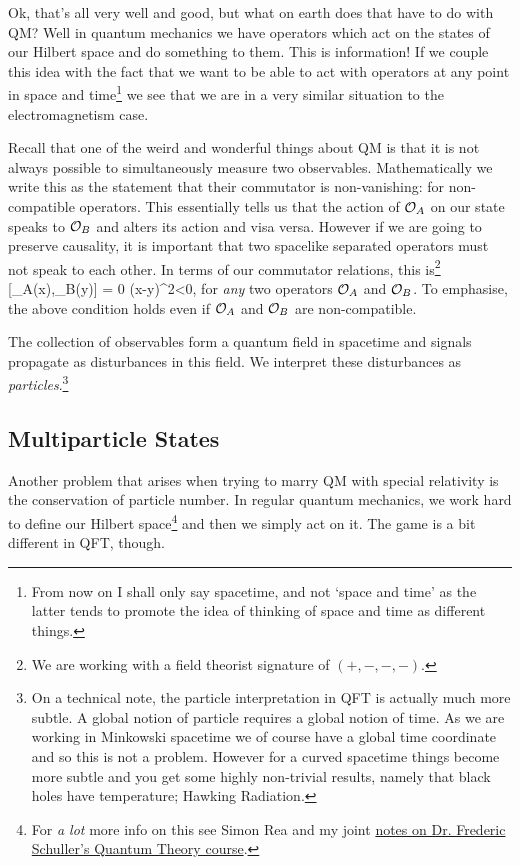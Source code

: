 Ok, that's all very well and good, but what on earth does that have to do with QM? Well in quantum mechanics we have operators which act on the states of our Hilbert space and do something to them. This is information! If we couple this idea with the fact that we want to be able to act with operators at any point in space and time\footnote{From now on I shall only say spacetime, and not `space and time' as the latter tends to promote the idea of thinking of space and time as different things.} we see that we are in a very similar situation to the electromagnetism case. 

Recall that one of the weird and wonderful things about QM is that it is not always possible to simultaneously measure two observables. Mathematically we write this as the statement that their commutator is non-vanishing:
 
\ese 
for non-compatible operators. This essentially tells us that the action of $\mathcal{O}_A$ on our state speaks to $\mathcal{O}_B$ and alters its action and visa versa. However if we are going to preserve causality, it is important that two spacelike separated operators must not speak to each other. In terms of our commutator relations, this is\footnote{We are working with a field theorist signature of $(+,-,-,-)$.}
\be
\label{eqn:CausualOperators}
    [\hat{\cO}_A(x),\hat{\cO}_B(y)] = 0  \qquad {} (x-y)^2<0,
\ee 
for \textit{any} two operators $\mathcal{O}_A$ and $\mathcal{O}_B$. To emphasise, the above condition holds even if $\mathcal{O}_A$ and $\mathcal{O}_B$ are non-compatible. 

The collection of observables form a quantum field in spacetime and signals propagate as disturbances in this field. We interpret these disturbances as \textit{particles}.\footnote{On a technical note, the particle interpretation in QFT is actually much more subtle. A global notion of particle requires a global notion of time. As we are working in Minkowski spacetime we of course have a global time coordinate and so this is not a problem. However for a curved spacetime things become more subtle and you get some highly non-trivial results, namely that black holes have temperature; Hawking Radiation.}

\subsection{Multiparticle States}

Another problem that arises when trying to marry QM with special relativity is the conservation of particle number. In regular quantum mechanics, we work hard to define our Hilbert space\footnote{For \textit{a lot} more info on this see Simon Rea and my joint \href{https://richie291.wixsite.com/theoreticalphysics/post/dr-frederic-schuller-s-course-of-quantum-theory}{notes on Dr. Frederic Schuller's Quantum Theory course}.} and then we simply act on it. The game is a bit different in QFT, though. 

